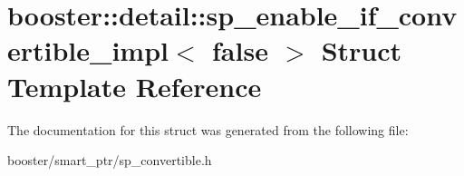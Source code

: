 \section{booster\+:\+:detail\+:\+:sp\+\_\+enable\+\_\+if\+\_\+convertible\+\_\+impl$<$ false $>$ Struct Template Reference}
\label{structbooster_1_1detail_1_1sp__enable__if__convertible__impl_3_01false_01_4}


The documentation for this struct was generated from the following file\+:\begin{DoxyCompactItemize}
\item 
booster/smart\+\_\+ptr/sp\+\_\+convertible.\+h\end{DoxyCompactItemize}
